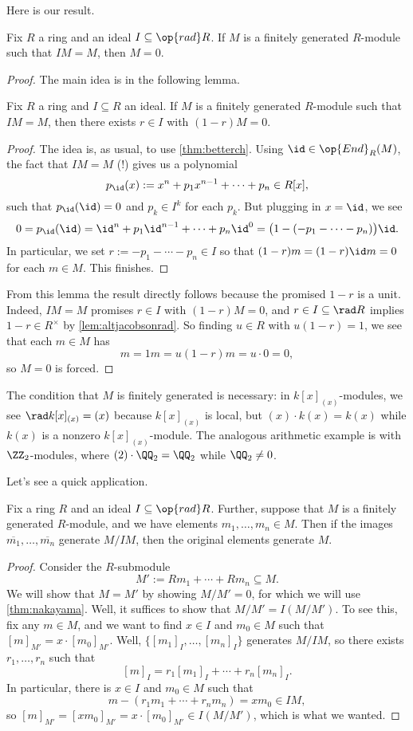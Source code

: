 Here is our result.
\begin{theorem} \label{thm:nakayama}
	Fix $R$ a ring and an ideal $I\subseteq\op{rad}R$. If $M$ is a finitely generated $R$-module such that $IM=M$, then $M=0$.
\end{theorem}
\begin{proof}
	The main idea is in the following lemma.
	\begin{lemma}
		Fix $R$ a ring and $I\subseteq R$ an ideal. If $M$ is a finitely generated $R$-module such that $IM=M$, then there exists $r\in I$ with $(1-r)M=0$.
	\end{lemma}
	\begin{proof}
		The idea is, as usual, to use \autoref{thm:betterch}. Using $\id\in\op{End}_R(M)$, the fact that $IM=M$ (!) gives us a polynomial
		\[p_{\id}(x):=x^n+p_1x^{n-1}+\cdots+p_n\in R[x],\]
		such that $p_{\id}({\id})=0$ and $p_k\in I^k$ for each $p_k$. But plugging in $x=\id$, we see
		\[0=p_{\id}({\id})={\id}^n+p_1{\id}^{n-1}+\cdots+p_n{\id}^0=\big(1-(-p_1-\cdots-p_n)\big){\id}.\]
		In particular, we set $r:=-p_1-\cdots-p_n\in I$ so that $(1-r)m=(1-r)\id m=0$ for each $m\in M$. This finishes.
	\end{proof}
	From this lemma the result directly follows because the promised $1-r$ is a unit. Indeed, $IM=M$ promises $r\in I$ with $(1-r)M=0$, and $r\in I\subseteq\rad R$ implies $1-r\in R^\times$ by \autoref{lem:altjacobsonrad}. So finding $u\in R$ with $u(1-r)=1$, we see that each $m\in M$ has
	\[m=1m=u(1-r)m=u\cdot 0=0,\]
	so $M=0$ is forced.
\end{proof}
\begin{remark}[Nir] \label{rem:fingennakayama}
	The condition that $M$ is finitely generated is necessary: in $k[x]_{(x)}$-modules, we see $\rad k[x]_{(x)}=(x)$ because $k[x]_{(x)}$ is local, but $(x)\cdot k(x)=k(x)$ while $k(x)$ is a nonzero $k[x]_{(x)}$-module. The analogous arithmetic example is with $\ZZ_2$-modules, where $(2)\cdot\QQ_2=\QQ_2$ while $\QQ_2\ne0$.
\end{remark}
Let's see a quick application.
\begin{corollary}
	Fix a ring $R$ and an ideal $I\subseteq\op{rad}R$. Further, suppose that $M$ is a finitely generated $R$-module, and we have elements $m_1,\ldots,m_n\in M$. Then if the images $\overline{m_1},\ldots,\overline{m_n}$ generate $M/IM$, then the original elements generate $M$.
\end{corollary}
\begin{proof}
	Consider the $R$-submodule
	\[M':=Rm_1+\cdots+Rm_n\subseteq M.\]
	We will show that $M=M'$ by showing $M/M'=0$, for which we will use \autoref{thm:nakayama}. Well, it suffices to show that $M/M'=I(M/M')$. To see this, fix any $m\in M$, and we want to find $x\in I$ and $m_0\in M$ such that $[m]_{M'}=x\cdot[m_0]_{M'}$. Well, $\{[m_1]_I,\ldots,[m_n]_I\}$ generates $M/IM$, so there exists $r_1,\ldots,r_n$ such that
	\[[m]_I=r_1[m_1]_{I}+\cdots+r_n[m_n]_I.\]
	In particular, there is $x\in I$ and $m_0\in M$ such that
	\[m-(r_1m_1+\cdots+r_nm_n)=xm_0\in IM,\]
	so $[m]_{M'}=[xm_0]_{M'}=x\cdot[m_0]_{M'}\in I(M/M')$, which is what we wanted.
\end{proof}
